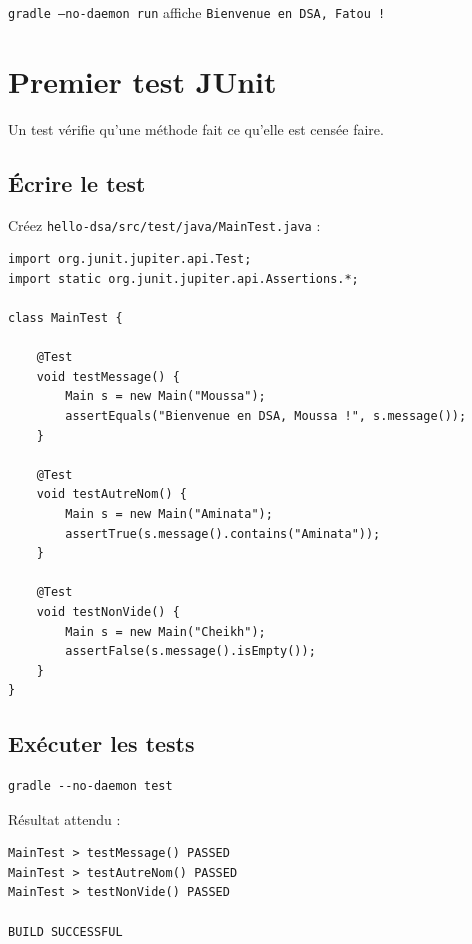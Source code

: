 \documentclass[11pt,a4paper]{article}
\begin{document}
\begin{exercicebox}[Vérification 4]
\texttt{gradle --no-daemon run} affiche \texttt{Bienvenue en DSA, Fatou !}
\end{exercicebox}

\section{Premier test JUnit}

Un test vérifie qu'une méthode fait ce qu'elle est censée faire.

\subsection{Écrire le test}

Créez \texttt{hello-dsa/src/test/java/MainTest.java} :

\begin{lstlisting}[style=java]
import org.junit.jupiter.api.Test;
import static org.junit.jupiter.api.Assertions.*;

class MainTest {

    @Test
    void testMessage() {
        Main s = new Main("Moussa");
        assertEquals("Bienvenue en DSA, Moussa !", s.message());
    }

    @Test
    void testAutreNom() {
        Main s = new Main("Aminata");
        assertTrue(s.message().contains("Aminata"));
    }

    @Test
    void testNonVide() {
        Main s = new Main("Cheikh");
        assertFalse(s.message().isEmpty());
    }
}
\end{lstlisting}

\subsection{Exécuter les tests}

\begin{lstlisting}[style=bash]
gradle --no-daemon test
\end{lstlisting}

Résultat attendu :

\begin{lstlisting}[style=bash]
MainTest > testMessage() PASSED
MainTest > testAutreNom() PASSED
MainTest > testNonVide() PASSED

BUILD SUCCESSFUL
\end{lstlisting}
\end{document}
